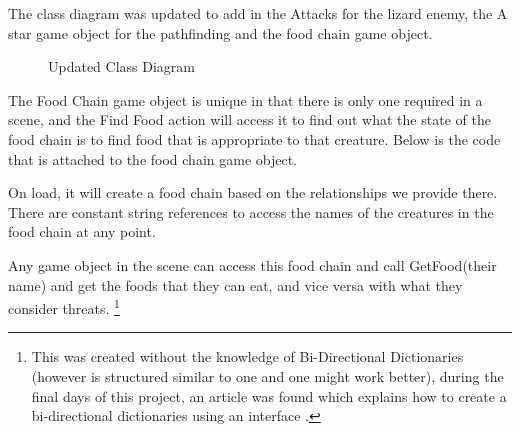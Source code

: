 \documentclass[11pt]{report}
\begin{document}
The class diagram was updated to add in the Attacks for the lizard enemy, the A star game object for the pathfinding and the food chain game object.

\begin{figure}[H]
    \centering
    \caption{Updated Class Diagram}
\end{figure}

The Food Chain game object is unique in that there is only one required in a scene, and the Find Food action will access it to find out what the state of the food chain is to find food that is appropriate to that creature. Below is the code that is attached to the food chain game object.

On load, it will create a food chain based on the relationships we provide there. There are constant string references to access the names of the creatures in the food chain at any point.

Any game object in the scene can access this food chain and call GetFood(their name) and get the foods that they can eat, and vice versa with what they consider threats. \footnote{This was created without the knowledge of Bi-Directional Dictionaries (however is structured similar to one and one might work better), during the final days of this project, an article was found which explains how to create a bi-directional dictionaries using an interface \cite{biDirectionalDictionaries}.}
\end{document}
